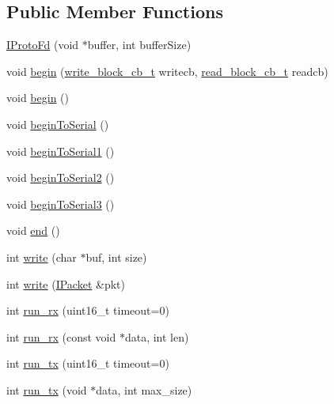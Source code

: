 \subsection*{Public Member Functions}
\begin{DoxyCompactItemize}
\item 
\hyperlink{classTiny_1_1IProtoFd_a65976c6faaf41504b7c15036edc054cf}{I\+Proto\+Fd} (void $\ast$buffer, int buffer\+Size)
\item 
void \hyperlink{classTiny_1_1IProtoFd_aae4e613316866105c130d613ecb25dd4}{begin} (\hyperlink{tiny__types_8h_aafd634660bba76cace57a8f9b01e044d}{write\+\_\+block\+\_\+cb\+\_\+t} writecb, \hyperlink{tiny__types_8h_a15bec127d9ee63658563d62e92b5261b}{read\+\_\+block\+\_\+cb\+\_\+t} readcb)
\item 
void \hyperlink{classTiny_1_1IProtoFd_a33f836591bf981b484d495d678d02442}{begin} ()
\item 
void \hyperlink{classTiny_1_1IProtoFd_a1cf42b4182e49dcde4862a768d07c811}{begin\+To\+Serial} ()
\item 
void \hyperlink{classTiny_1_1IProtoFd_a7d41a0caae1d5e6808a441c821ed8927}{begin\+To\+Serial1} ()
\item 
void \hyperlink{classTiny_1_1IProtoFd_ae7582aca0fa5472da6f4ae2911d56259}{begin\+To\+Serial2} ()
\item 
void \hyperlink{classTiny_1_1IProtoFd_a2d4df949358d4e8afa391e8960729d71}{begin\+To\+Serial3} ()
\item 
void \hyperlink{classTiny_1_1IProtoFd_ad17e76d0ef7ea40838e51acc2498c482}{end} ()
\item 
int \hyperlink{classTiny_1_1IProtoFd_adea59df6702e16fd986a91c7ee62012a}{write} (char $\ast$buf, int size)
\item 
int \hyperlink{classTiny_1_1IProtoFd_aa822a1dec320e6edc70a84699371fe81}{write} (\hyperlink{classTiny_1_1IPacket}{I\+Packet} \&pkt)
\item 
int \hyperlink{classTiny_1_1IProtoFd_a37292eb5c9faf1be8c4850985e0ae2eb}{run\+\_\+rx} (uint16\+\_\+t timeout=0)
\item 
int \hyperlink{classTiny_1_1IProtoFd_ab297fec86ef473612a745865403b4dd0}{run\+\_\+rx} (const void $\ast$data, int len)
\item 
int \hyperlink{classTiny_1_1IProtoFd_a19be0bd5124009c7de051554841070b3}{run\+\_\+tx} (uint16\+\_\+t timeout=0)
\item 
int \hyperlink{classTiny_1_1IProtoFd_a5510f1f28ff72c709305826c96473ffb}{run\+\_\+tx} (void $\ast$data, int max\+\_\+size)
\item 

\end{DoxyCompactItemize}
